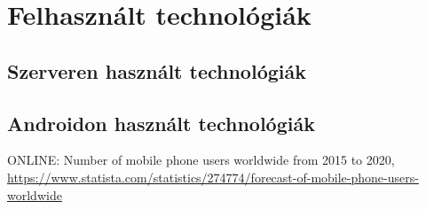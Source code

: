 \documentclass{thesis-ekf}             %
\theoremstyle{definition}
\theoremstyle{remark}
\begin{document}
\chapter{Felhasznált technológiák}\label{technologiak}

\section{Szerveren használt technológiák}

\section{Androidon használt technológiák}

\begin{thebibliography}{1}
 \textsc{ONLINE}: Number of mobile phone users worldwide from 2015 to 2020, \url{https://www.statista.com/statistics/274774/forecast-of-mobile-phone-users-worldwide}
\end{thebibliography}
\end{document}
